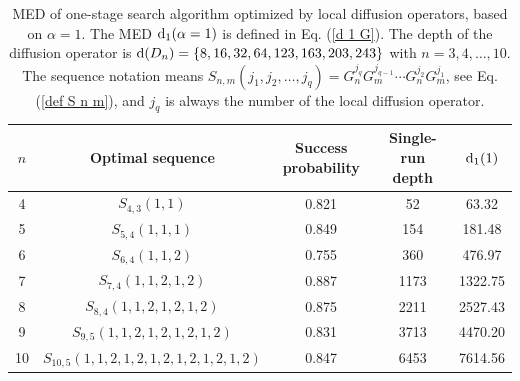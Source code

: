 \documentclass[%
 twocolumn,
 10pt,
 superscriptaddress,
 longbibliography,
 amsmath,amssymb,
 aps,
 pra,
floatfix,
]{revtex4-1}
\begin{document}
\begin{table}[h]

	\begin{ruledtabular}
		\caption{\label{Table 2} MED of one-stage search algorithm optimized by local diffusion operators, based on $\alpha=1$. The MED $\text d_1(\alpha=1)$ is defined in Eq. (\ref{d 1 G}). The depth of the diffusion operator is $\text d(D_n)=\{8,16,32,64,123,163,203,243\}$ with $n=3,4,\ldots,10$. The sequence notation means $S_{n,m}(j_1,j_2,\ldots,j_q) = G_n^{j_q}G_m^{j_{q-1}}\cdots G_n^{j_2}G_m^{j_1}$, see Eq. (\ref{def S n m}), and $j_q$ is always the number of the local diffusion operator.}
		\begin{tabular}{ccccc}

			$n$ & Optimal sequence                      & Success probability & Single-run depth & $\text d_1(1)$ \\ \hline

			4   & $S_{4,3}(1,1)$                        & 0.821               & 52               & 63.32          \\

			5   & $S_{5,4}(1,1,1)$                      & 0.849               & 154              & 181.48         \\

			6   & $S_{6,4}(1,1,2)$                      & 0.755               & 360              & 476.97         \\

			7   & $S_{7,4}(1,1,2,1,2)$                  & 0.887               & 1173             & 1322.75        \\

			8   & $S_{8,4}(1,1,2,1,2,1,2)$              & 0.875               & 2211             & 2527.43        \\

			9   & $S_{9,5}(1,1,2,1,2,1,2,1,2)$          & 0.831               & 3713             & 4470.20        \\

			10  & $S_{10,5}(1,1,2,1,2,1,2,1,2,1,2,1,2)$ & 0.847               & 6453             & 7614.56        \\
		\end{tabular}
	\end{ruledtabular}
\end{table}
\end{document}
